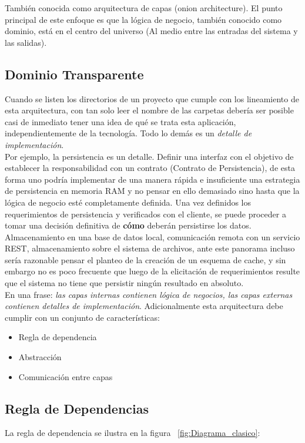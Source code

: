 También conocida como arquitectura de capas (onion architecture). El punto principal de este enfoque es que la lógica de negocio, también conocido como dominio, está en el centro del universo (Al medio entre las entradas del sistema y las salidas)\cite{clean_bob}.
\subsection{Dominio Transparente}
Cuando se listen los directorios de un proyecto que cumple con los lineamiento de esta arquitectura, con tan solo leer el nombre de las carpetas debería ser posible casi de inmediato tener una idea de qué se trata esta aplicación, independientemente de la tecnología. Todo lo demás es un \emph{detalle de implementación}\cite{clean_five}. \\
Por ejemplo, la persistencia es un detalle. Definir una interfaz con el objetivo de establecer la responsabilidad con un contrato (Contrato de Persistencia),  de esta forma uno podría implementar de una manera rápida e insuficiente una estrategia de persistencia en memoria RAM y no pensar en ello demasiado sino hasta que la lógica de negocio esté completamente definida. Una vez definidos los requerimientos de persistencia y verificados con el cliente, se puede proceder a tomar una decisión definitiva de \textbf{cómo} deberán persistirse los datos.\\ 
Almacenamiento en una base de datos local, comunicación remota con un servicio REST, almacenamiento sobre el sistema de archivos, ante este panorama incluso sería razonable pensar el planteo de la creación de un esquema de cache, y sin embargo no es poco frecuente que luego de la elicitación de requerimientos resulte que el sistema no tiene que persistir ningún resultado en absoluto.\\ 
En una frase: \textit{las capas internas contienen lógica de negocios, las capas externas contienen detalles de implementación}.
Adicionalmente esta arquitectura debe cumplir con un conjunto de características:

\begin{itemize}
	\item Regla de dependencia
	\item Abstracción
	\item Comunicación entre capas
\end{itemize}

\subsection{Regla de Dependencias}
La regla de dependencia se ilustra en la figura ~\ref{fig:Diagrama_clasico}:

